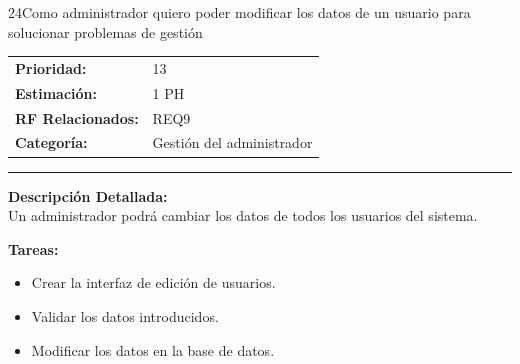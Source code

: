 \begin{hu_card}{24}{Como administrador quiero poder modificar los datos de un usuario para solucionar problemas de gestión}
    \begin{tabularx}{\linewidth}{l X}
        \textbf{Prioridad:}   & 13\\
        \textbf{Estimación:}  & 1 PH \\
        \textbf{RF Relacionados:} & REQ9 \\
        \textbf{Categoría:} & Gestión del administrador \\
    \end{tabularx}

    \vspace{2mm}
    \hrule
    \vspace{2mm}

    \textbf{Descripción Detallada:} \\
    Un administrador podrá cambiar los datos de todos los usuarios del sistema.

    \vspace{2mm}
    \textbf{Tareas:}
    \begin{itemize}[noitemsep, topsep=0pt]
        \item Crear la interfaz de edición de usuarios.
        \item Validar los datos introducidos.
        \item Modificar los datos en la base de datos.
    \end{itemize}


\end{hu_card}
